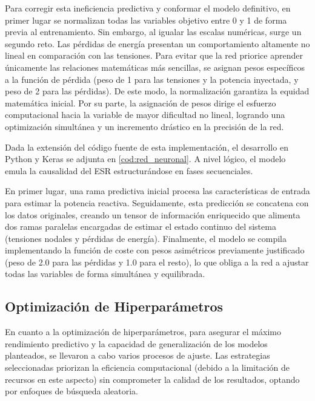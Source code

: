 Para corregir esta ineficiencia predictiva y conformar el modelo definitivo, en primer lugar se normalizan todas las variables objetivo entre 0 y 1 de forma previa al entrenamiento. Sin embargo, al igualar las escalas numéricas, surge un segundo reto. Las pérdidas de energía presentan un comportamiento altamente no lineal en comparación con las tensiones. Para evitar que la red priorice aprender únicamente las relaciones matemáticas más sencillas, se asignan pesos específicos a la función de pérdida (peso de 1 para las tensiones y la potencia inyectada, y peso de 2 para las pérdidas). De este modo, la normalización garantiza la equidad matemática inicial. Por su parte, la asignación de pesos dirige el esfuerzo computacional hacia la variable de mayor dificultad no lineal, logrando una optimización simultánea y un incremento drástico en la precisión de la red.

Dada la extensión del código fuente de esta implementación, el desarrollo en Python y Keras se adjunta en \ref{cod:red_neuronal}. A nivel lógico, el modelo emula la causalidad del ESR estructurándose en fases secuenciales.

En primer lugar, una rama predictiva inicial procesa las características de entrada para estimar la potencia reactiva. Seguidamente, esta predicción se concatena con los datos originales, creando un tensor de información enriquecido que alimenta dos ramas paralelas encargadas de estimar el estado continuo del sistema (tensiones nodales y pérdidas de energía). Finalmente, el modelo se compila implementando la función de coste con pesos asimétricos previamente justificado (peso de 2.0 para las pérdidas y 1.0 para el resto), lo que obliga a la red a ajustar todas las variables de forma simultánea y equilibrada.

\subsection{Optimización de Hiperparámetros}
En cuanto a la optimización de hiperparámetros, para asegurar el máximo rendimiento predictivo y la capacidad de generalización de los modelos planteados, se llevaron a cabo varios procesos de ajuste. Las estrategias seleccionadas priorizan la eficiencia computacional (debido a la limitación de recursos en este aspecto) sin comprometer la calidad de los resultados, optando por enfoques de búsqueda aleatoria. 

